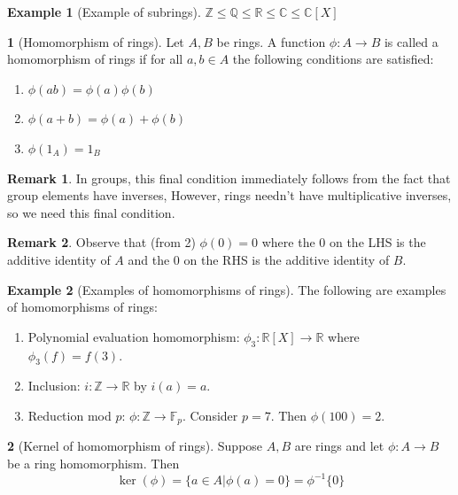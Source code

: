 \documentclass[12pt]{article}
\theoremstyle{definition}
\newtheorem{definition}{\color{NavyBlue}{\textbf{Definition}}}
\newcommand{\R}{\mathbb{R}}
\newcommand{\Z}{\mathbb{Z}}
\newtheorem{example}{\color{WildStrawberry}Example}
\newtheorem{remark}{Remark}
\theoremstyle{definition}
\begin{document}
\begin{example}[Example of subrings]
	$\Z \leq \mathbb{Q} \leq \R \leq \mathbb{C} \leq \mathbb{C}[X]$
\end{example}

\begin{definition}[Homomorphism of rings]
	Let $A,B$ be rings. A function $\phi: A \to B$ is called a homomorphism of rings if for all $a,b \in A$ the following conditions are satisfied:
	\begin{enumerate}
		\item $\phi(ab) = \phi(a)\phi(b)$
		\item $\phi(a+b) = \phi(a) + \phi(b)$
		\item $\phi(1_A) = 1_B$
	\end{enumerate}
\end{definition}

\begin{remark}
	In groups, this final condition immediately follows from the fact that group elements have inverses, However, rings needn't have multiplicative inverses, so we need this final condition.
\end{remark}
\begin{remark}
	Observe that (from 2) $\phi(0) = 0$ where the $0$ on the LHS is the additive identity of $A$ and the $0$ on the RHS is the additive identity of $B$. 
\end{remark}

\begin{example}[Examples of homomorphisms of rings]
	The following are examples of homomorphisms of rings:
	\begin{enumerate}
		\item Polynomial evaluation homomorphism: $\phi_3:\R[X] \to \R$ where $\phi_3(f) = f(3)$.
		\item Inclusion: $i: \Z \to \R$ by $i(a) = a$. 
		\item Reduction mod $p$: $\phi : \Z \to \mathbb{F}_p$. Consider $p=7$. Then $\phi(100) = 2$.
	\end{enumerate}
\end{example}

\begin{definition}[Kernel of homomorphism of rings]
	Suppose $A,B$ are rings and let $\phi:A \to B$ be a ring homomorphism. Then
	\begin{equation}
		\ker(\phi) = \{a \in A | \phi(a) = 0\} = \phi^{-1}\{0\}
	\end{equation}
\end{definition}
\end{document}
